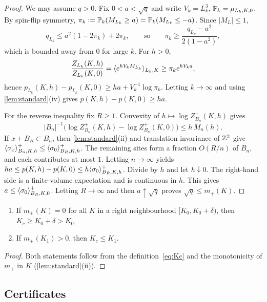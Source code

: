 \begin{proof}
We may assume $q>0$. Fix $0<a<\sqrt q$ and write $V_k=L_k^3$, $\mathbb P_k=\mu_{L_k,K,0}$. By spin-flip symmetry, $\pi_k:=\mathbb P_k(M_{L_k}\ge a)=\mathbb P_k(M_{L_k}\le-a)$. Since $|M_L|\le1$,
\[
 q_{L_k}\le a^2(1-2\pi_k)+2\pi_k,\qquad\text{so}\qquad \pi_k\ge\frac{q_{L_k}-a^2}{2(1-a^2)},
\]
which is bounded away from $0$ for large $k$. For $h>0$,
\[
 \frac{Z_{L_k}(K,h)}{Z_{L_k}(K,0)}=\langle e^{hV_kM_{L_k}}\rangle_{L_k,K}\ge\pi_ke^{hV_ka},
\]
hence $p_{L_k}(K,h)-p_{L_k}(K,0)\ge ha+V_k^{-1}\log\pi_k$. Letting $k\to\infty$ and using \cref{lem:standard}(iv) gives $p(K,h)-p(K,0)\ge ha$.

For the reverse inequality fix $R\ge1$. Convexity of $h\mapsto\log Z^+_{B_n}(K,h)$ gives
\[
 |B_n|^{-1}\bigl(\log Z^+_{B_n}(K,h)-\log Z^+_{B_n}(K,0)\bigr)\le h\,\overline M_n(h).
\]
If $x+B_R\subset B_n$, then \cref{lem:standard}(ii) and translation invariance of $\mathbb Z^3$ give $\langle \sigma_x\rangle^+_{B_n,K,h}\le\langle \sigma_0\rangle^+_{B_R,K,h}$. The remaining sites form a fraction $O(R/n)$ of $B_n$, and each contributes at most $1$. Letting $n\to\infty$ yields $ha\le p(K,h)-p(K,0)\le h\langle \sigma_0\rangle^+_{B_R,K,h}$. Divide by $h$ and let $h\downarrow0$. The right-hand side is a finite-volume expectation and is continuous in $h$. This gives $a\le\langle \sigma_0\rangle^+_{B_R,K,0}$. Letting $R\to\infty$ and then $a\uparrow\sqrt q$ proves $\sqrt q\le m_+(K)$.
\end{proof}

\begin{corollary}\label{cor:monotone}
\begin{enumerate}
\item If $m_+(K)=0$ for all $K$ in a right neighbourhood $[K_0,K_0+\delta)$, then $K_c\ge K_0+\delta>K_0$.
\item If $m_+(K_1)>0$, then $K_c\le K_1$.
\end{enumerate}
\end{corollary}

\begin{proof}
Both statements follow from the definition~\eqref{eq:Kc} and the monotonicity of $m_+$ in $K$ (\cref{lem:standard}(ii)).
\end{proof}

\subsection{Certificates}\label{sec:conventions}

